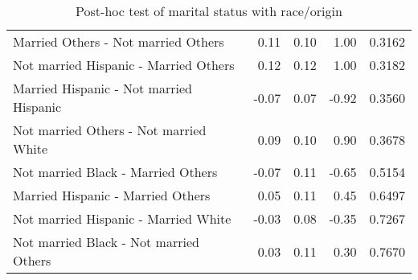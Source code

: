 \begin{table}[H]
\begin{tabular}{lrrrr}
    Married Others -  Not married Others & 0.11 & 0.10 & 1.00 & 0.3162 \\ 
    Not married Hispanic -  Married Others & 0.12 & 0.12 & 1.00 & 0.3182 \\ 
    Married Hispanic -  Not married Hispanic & -0.07 & 0.07 & -0.92 & 0.3560 \\ 
    Not married Others -  Not married White & 0.09 & 0.10 & 0.90 & 0.3678 \\ 
    Not married Black -  Married Others & -0.07 & 0.11 & -0.65 & 0.5154 \\ 
    Married Hispanic -  Married Others & 0.05 & 0.11 & 0.45 & 0.6497 \\ 
    Not married Hispanic -  Married White & -0.03 & 0.08 & -0.35 & 0.7267 \\ 
    Not married Black -  Not married Others & 0.03 & 0.11 & 0.30 & 0.7670 \\ 
  \hline
\end{tabular}
\caption{Post-hoc test of marital status with race/origin} 
\label{tab:DisabMSRaceOrigin}
\end{table}


